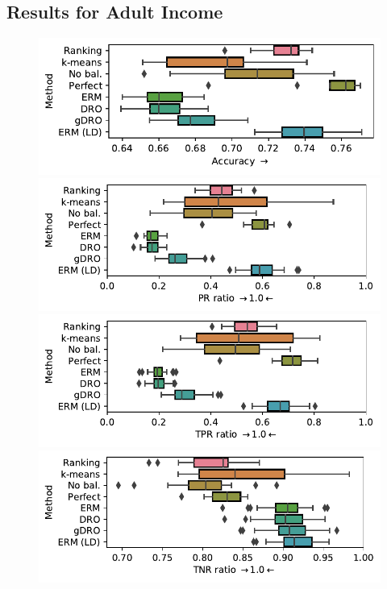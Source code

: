 \subsection{Results for Adult Income}\label{sec:adult-results}
\begin{figure}[p]
    \centering
    \includegraphics[width=\columnwidth]{paper3/figures/adult_partial_acc.pdf}
    \includegraphics[width=\columnwidth]{paper3/figures/adult_partial_prr.pdf}
    \includegraphics[width=\columnwidth]{paper3/figures/adult_partial_tprr.pdf}
    \includegraphics[width=\columnwidth]{paper3/figures/adult_partial_tnrr.pdf}

\end{figure}
